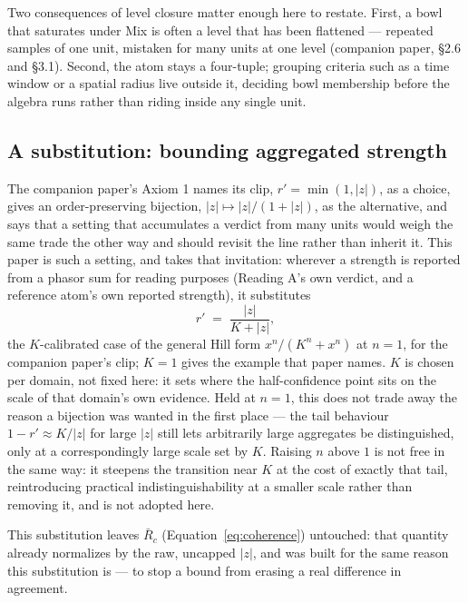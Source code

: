 \documentclass[12pt, a4paper]{article}
\begin{document}
Two consequences of level closure matter enough here to restate. First,
a bowl that saturates under Mix is often a level that has been
flattened --- repeated samples of one unit, mistaken for many units at
one level (companion paper, \S2.6 and \S3.1). Second, the atom stays a
four-tuple; grouping criteria such as a time window or a spatial
radius live outside it, deciding bowl membership before the algebra
runs rather than riding inside any single unit.

\subsection{A substitution: bounding aggregated strength}
\label{subsec:bijection_substitution}

The companion paper's Axiom 1 names its clip, $r'=\min(1,|z|)$, as a
choice, gives an order-preserving bijection, $|z|\mapsto|z|/(1+|z|)$,
as the alternative, and says that a setting that accumulates a
verdict from many units would weigh the same trade the other way and
should revisit the line rather than inherit it. This paper is such a
setting, and takes that invitation: wherever a strength is reported from a phasor sum for
reading purposes (Reading A's own verdict, and a reference atom's own
reported strength), it substitutes
\begin{equation}
    r' \;=\; \frac{|z|}{K+|z|},
    \label{eq:bijection}
\end{equation}
the $K$-calibrated case of the general Hill form $x^n/(K^n+x^n)$ at $n=1$, for the companion paper's clip; $K=1$ gives the example that paper names. $K$ is chosen per domain, not
fixed here: it sets where the half-confidence point sits on the scale
of that domain's own evidence. Held at $n=1$, this does not trade away
the reason a bijection was wanted in the first place --- the tail
behaviour $1-r'\approx K/|z|$ for large $|z|$ still lets arbitrarily
large aggregates be distinguished, only at a correspondingly large
scale set by $K$. Raising $n$ above $1$ is not free in the same way:
it steepens the transition near $K$ at the cost of exactly that tail,
reintroducing practical indistinguishability at a smaller scale rather
than removing it, and is not adopted here.

This substitution leaves $\bar R_c$ (Equation~\eqref{eq:coherence})
untouched: that quantity already normalizes by the raw, uncapped
$|z|$, and was built for the same reason this substitution is --- to
stop a bound from erasing a real difference in agreement.
\end{document}

